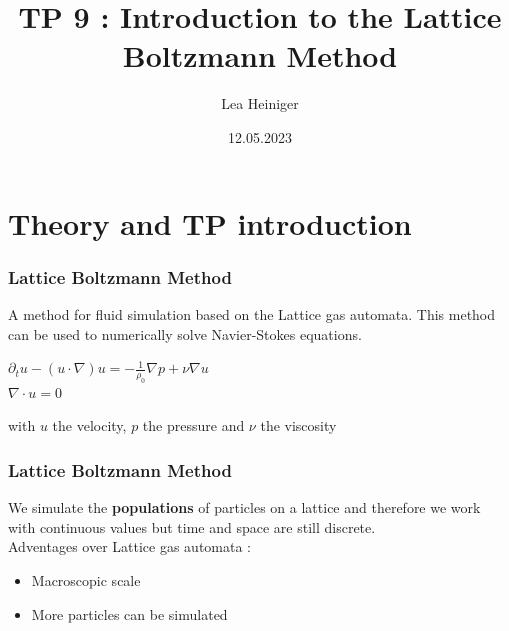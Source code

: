 \documentclass{beamer}
\begin{document}
\title[MSPN]{TP 9 : Introduction to the Lattice Boltzmann Method}
\author{Lea Heiniger}
\date{12.05.2023}

\begin{frame}
\titlepage
\end{frame}

\section*{Theory and TP introduction}
\begin{frame}[fragile]
\frametitle{Lattice Boltzmann Method}
A method for fluid simulation based on the Lattice gas automata. This method can be used to numerically solve Navier-Stokes equations.\\
\bigskip
\begin{center}
\begin{large}
$\partial_{t}u-(u\cdot\nabla ) u = -\frac{1}{\rho_{0}}\nabla p+ \nu\nabla u$\\
$\nabla\cdot u=0$\\
\end{large}
\end{center}
with $u$ the velocity, $p$ the pressure and $\nu$ the viscosity
\end{frame}

\begin{frame}[fragile]
\frametitle{Lattice Boltzmann Method}
We simulate the \textbf{populations} of particles on a lattice and therefore we work with continuous values but time and space are still discrete.\\ %
\bigskip\bigskip
Adventages over Lattice gas automata :\\
\begin{itemize}
\item Macroscopic scale\\
\item More particles can be simulated
\end{itemize}

\end{frame}
\end{document}
